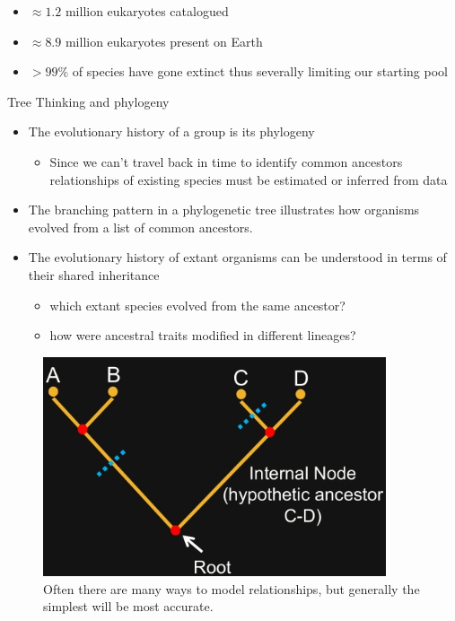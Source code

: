 \documentclass[]{article}
\begin{document}
\begin{itemize}
	\item $\approx 1.2$ million eukaryotes catalogued
	\item $\approx 8.9$ million eukaryotes present on Earth
	\item $>99\%$ of species have gone extinct thus severally limiting our starting pool
\end{itemize}

Tree Thinking and phylogeny
\begin{itemize}
	\item The evolutionary history of a group is its phylogeny
	\begin{itemize}
		\item Since we can’t travel back in time to identify
		common ancestors relationships of existing
		species must be estimated or inferred from data
	\end{itemize}
	\item The branching pattern in a phylogenetic tree illustrates how organisms evolved from a list of common ancestors.
	\item The evolutionary history of extant organisms can
	be understood in terms of their shared inheritance
	\begin{itemize}
		\item which extant species evolved from the same
		ancestor?
		\item how were ancestral traits modified in different
		lineages?
	\end{itemize}
\end{itemize}

\begin{figure}[H]
	\caption{Often there are many ways to model relationships, but generally the simplest will be most accurate.}\label{PhylogenicTree}
	\includegraphics[width=0.9\textwidth]{PhylogenicTree}
\end{figure}
\end{document}
